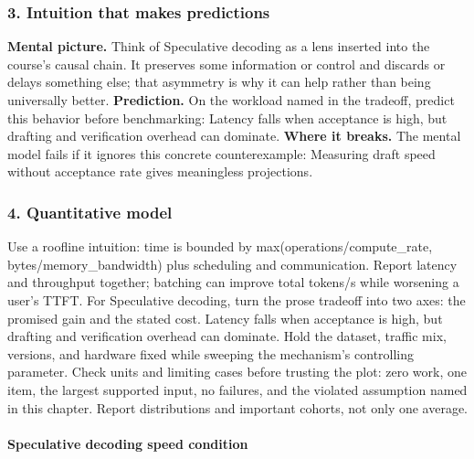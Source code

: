 \subsubsection*{3. Intuition that makes predictions}
\textbf{Mental picture.} Think of Speculative decoding as a lens inserted into the course's causal chain. It preserves some information or control and discards or delays something else; that asymmetry is why it can help rather than being universally better.
\textbf{Prediction.} On the workload named in the tradeoff, predict this behavior before benchmarking: Latency falls when acceptance is high, but drafting and verification overhead can dominate.
\textbf{Where it breaks.} The mental model fails if it ignores this concrete counterexample: Measuring draft speed without acceptance rate gives meaningless projections.
\subsubsection*{4. Quantitative model}
Use a roofline intuition: time is bounded by max(operations/compute\_rate, bytes/memory\_bandwidth) plus scheduling and communication. Report latency and throughput together; batching can improve total tokens/s while worsening a user's TTFT.
For Speculative decoding, turn the prose tradeoff into two axes: the promised gain and the stated cost. Latency falls when acceptance is high, but drafting and verification overhead can dominate. Hold the dataset, traffic mix, versions, and hardware fixed while sweeping the mechanism's controlling parameter.
Check units and limiting cases before trusting the plot: zero work, one item, the largest supported input, no failures, and the violated assumption named in this chapter. Report distributions and important cohorts, not only one average.
\paragraph{Speculative decoding speed condition}
